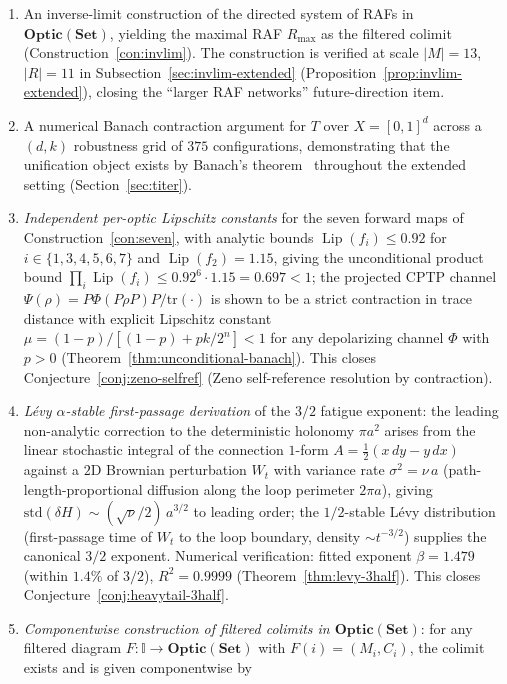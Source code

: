 \documentclass[11pt,a4paper]{article}
\theoremstyle{plain}
\theoremstyle{definition}
\theoremstyle{remark}
\newcommand{\Optic}{\mathbf{Optic}}
\DeclareMathOperator{\Lip}{Lip}
\begin{document}
\begin{enumerate}[leftmargin=*,itemsep=2pt]
(Section~\ref{sec:n4}).
\item An inverse-limit construction of the directed system of RAFs in
$\Optic(\mathbf{Set})$, yielding the maximal RAF $R_{\max}$ as the
filtered colimit (Construction~\ref{con:invlim}). The construction is
verified at scale $|M|=13$, $|R|=11$ in
Subsection~\ref{sec:invlim-extended}
(Proposition~\ref{prop:invlim-extended}), closing the
``larger RAF networks'' future-direction item.
\item A numerical Banach contraction argument for $T$ over $X=[0,1]^d$
across a $(d,k)$ robustness grid of $375$ configurations, demonstrating
that the unification object exists by Banach's theorem~\cite{banach1922}
throughout the extended setting (Section~\ref{sec:titer}).
\item \emph{Independent per-optic Lipschitz constants} for the seven
forward maps of Construction~\ref{con:seven}, with analytic bounds
$\Lip(f_i)\leq 0.92$ for $i\in\{1,3,4,5,6,7\}$ and $\Lip(f_2)=1.15$,
giving the unconditional product bound
$\prod_i\Lip(f_i)\leq 0.92^{6}\cdot 1.15 = 0.697 < 1$; the projected
CPTP channel $\Psi(\rho)=P\Phi(P\rho P)P/\mathrm{tr}(\cdot)$ is shown
to be a strict contraction in trace distance with explicit Lipschitz
constant $\mu=(1-p)/[(1-p)+pk/2^{n}]<1$ for any depolarizing channel
$\Phi$ with $p>0$ (Theorem~\ref{thm:unconditional-banach}). This closes
Conjecture~\ref{conj:zeno-selfref} (Zeno self-reference resolution by
contraction).
\item \emph{L\'evy $\alpha$-stable first-passage derivation} of the
$3/2$ fatigue exponent: the leading non-analytic correction to the
deterministic holonomy $\pi a^{2}$ arises from the linear stochastic
integral of the connection $1$-form $A=\tfrac{1}{2}(x\,dy-y\,dx)$ against
a $2$D Brownian perturbation $W_{t}$ with variance rate
$\sigma^{2}=\nu\,a$ (path-length-proportional diffusion along the loop
perimeter $2\pi a$), giving
$\mathrm{std}(\delta H)\sim(\sqrt{\nu}/2)\,a^{3/2}$ to leading order;
the $1/2$-stable L\'evy distribution (first-passage time of $W_{t}$ to
the loop boundary, density $\sim t^{-3/2}$) supplies the canonical
$3/2$ exponent. Numerical verification: fitted exponent
$\beta=1.479$ (within $1.4\%$ of $3/2$), $R^{2}=0.9999$
(Theorem~\ref{thm:levy-3half}). This closes
Conjecture~\ref{conj:heavytail-3half}.
\item \emph{Componentwise construction of filtered colimits in
$\Optic(\mathbf{Set})$}: for any filtered diagram
$F:\mathbb I\to\Optic(\mathbf{Set})$ with $F(i)=(M_{i},C_{i})$, the
colimit exists and is given componentwise by

\end{enumerate}
\end{document}
